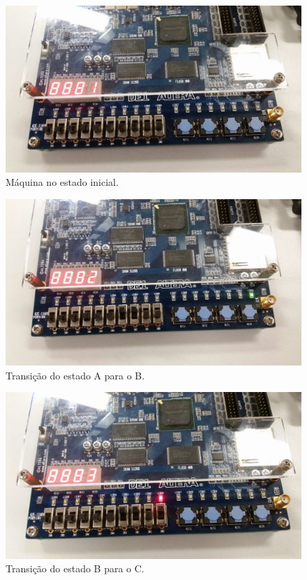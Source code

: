 		\begin{figure}[H]
			\includegraphics[width=1\textwidth]{img/placa/1}
			\caption{Máquina no estado inicial.\label{figura:deployMaquina1}}
		\end{figure}

		\begin{figure}[H]
			\includegraphics[width=1\textwidth]{img/placa/2}
			\caption{Transição do estado A para o B.\label{figura:deployMaquina2}}
		\end{figure}

		\begin{figure}[H]
			\includegraphics[width=1\textwidth]{img/placa/3}
			\caption{Transição do estado B para o C.\label{figura:deployMaquina3}}
		\end{figure}

